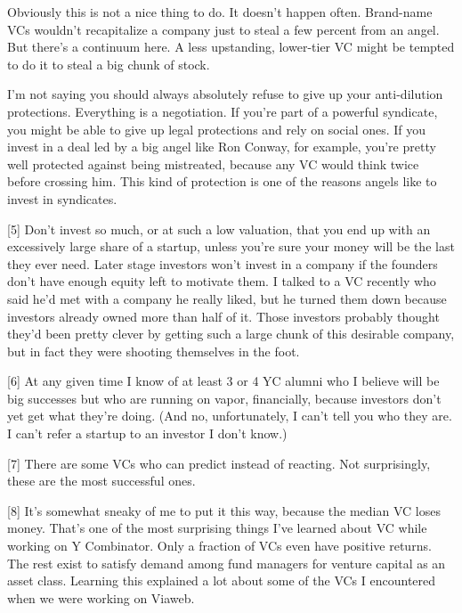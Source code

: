 Obviously this is
                  not a nice thing to do. It doesn't happen often. Brand-name
                  VCs wouldn't recapitalize a company just to steal a few
                  percent from an angel. But there's a continuum here. A less
                  upstanding, lower-tier VC might be tempted to do it to steal a
                  big chunk of stock.

I'm not saying you should
                  always absolutely refuse to give up your anti-dilution
                  protections. Everything is a negotiation. If you're part of a
                  powerful syndicate, you might be able to give up legal
                  protections and rely on social ones. If you invest in a deal
                  led by a big angel like Ron Conway, for example, you're pretty
                  well protected against being mistreated, because any VC would
                  think twice before crossing him. This kind of protection is
                  one of the reasons angels like to invest in syndicates.

[5] Don't invest so much, or at such a low valuation, that you
                  end up with an excessively large share of a startup, unless
                  you're sure your money will be the last they ever need. Later
                  stage investors won't invest in a company if the founders
                  don't have enough equity left to motivate them. I talked to a
                  VC recently who said he'd met with a company he really liked,
                  but he turned them down because investors already owned more
                  than half of it. Those investors probably thought they'd been
                  pretty clever by getting such a large chunk of this desirable
                  company, but in fact they were shooting themselves in the
                  foot.

[6] At any given time I know of at least 3 or 4 YC alumni who I
                  believe will be big successes but who are running on vapor,
                  financially, because investors don't yet get what they're
                  doing. (And no, unfortunately, I can't tell you who they are.
                  I can't refer a startup to an investor I don't know.)

[7] There are some VCs who can predict instead of reacting. Not
                  surprisingly, these are the most successful ones.

[8] It's somewhat sneaky of me to put it this way, because the
                  median VC loses money. That's one of the most surprising
                  things I've learned about VC while working on Y Combinator.
                  Only a fraction of VCs even have positive returns. The rest
                  exist to satisfy demand among fund managers for venture
                  capital as an asset class. Learning this explained a lot about
                  some of the VCs I encountered when we were working on
                  Viaweb.

